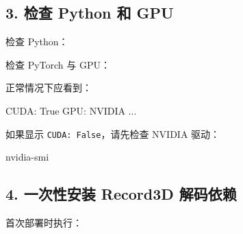 \documentclass[
  chinese,
  11pt,
  a4paper,
]{article}
\newenvironment{Shaded}{\begin{snugshade}}{\end{snugshade}}
\newcommand{\AttributeTok}[1]{\textcolor[rgb]{0.13,0.29,0.53}{#1}}
\newcommand{\ExtensionTok}[1]{#1}
\newcommand{\NormalTok}[1]{#1}
\newcommand{\StringTok}[1]{\textcolor[rgb]{0.31,0.60,0.02}{#1}}
\newcommand{\VariableTok}[1]{\textcolor[rgb]{0.00,0.00,0.00}{#1}}
\begin{document}
\subsection{3. 检查 Python 和
GPU}\label{3-ux68c0ux67e5-python-ux548c-gpu}

检查 Python：

\begin{Shaded}
\end{Shaded}

检查 PyTorch 与 GPU：

\begin{Shaded}
\end{Shaded}

正常情况下应看到：

\begin{Shaded}
\begin{Highlighting}[]
\NormalTok{CUDA: True}
\NormalTok{GPU: NVIDIA ...}
\end{Highlighting}
\end{Shaded}

如果显示 \texttt{CUDA:\ False}，请先检查 NVIDIA 驱动：

\begin{Shaded}
\begin{Highlighting}[]
\ExtensionTok{nvidia{-}smi}
\end{Highlighting}
\end{Shaded}

\subsection{4. 一次性安装 Record3D
解码依赖}\label{4-ux4e00ux6b21ux6027ux5b89ux88c5-record3d-ux89e3ux7801ux4f9dux8d56}

首次部署时执行：

\begin{Shaded}
\end{Shaded}
\end{document}
